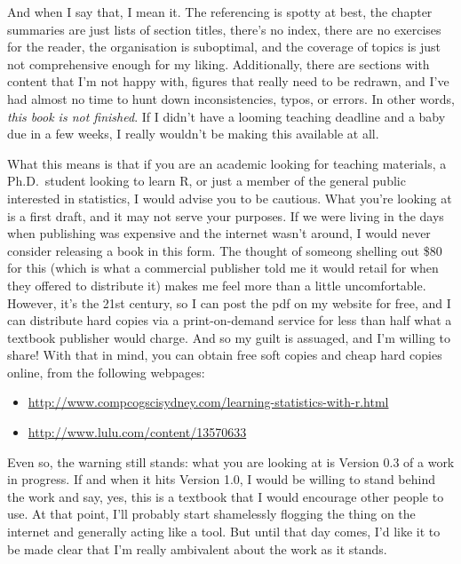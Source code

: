 \documentclass[
]{book}
\providecommand{\tightlist}{%
  \setlength{\itemsep}{0pt}\setlength{\parskip}{0pt}}
\begin{document}
And when I say that, I mean it. The referencing is spotty at best, the chapter summaries are just lists of section titles, there's no index, there are no exercises for the reader, the organisation is suboptimal, and the coverage of topics is just not comprehensive enough for my liking. Additionally, there are sections with content that I'm not happy with, figures that really need to be redrawn, and I've had almost no time to hunt down inconsistencies, typos, or errors. In other words, \emph{this book is not finished}. If I didn't have a looming teaching deadline and a baby due in a few weeks, I really wouldn't be making this available at all.

What this means is that if you are an academic looking for teaching materials, a Ph.D.~student looking to learn R, or just a member of the general public interested in statistics, I would advise you to be cautious. What you're looking at is a first draft, and it may not serve your purposes. If we were living in the days when publishing was expensive and the internet wasn't around, I would never consider releasing a book in this form. The thought of someong shelling out \$80 for this (which is what a commercial publisher told me it would retail for when they offered to distribute it) makes me feel more than a little uncomfortable. However, it's the 21st century, so I can post the pdf on my website for free, and I can distribute hard copies via a print-on-demand service for less than half what a textbook publisher would charge. And so my guilt is assuaged, and I'm willing to share! With that in mind, you can obtain free soft copies and cheap hard copies online, from the following webpages:

\begin{itemize}
\tightlist
\item
  \url{http://www.compcogscisydney.com/learning-statistics-with-r.html}
\item
  \url{http://www.lulu.com/content/13570633}
\end{itemize}

Even so, the warning still stands: what you are looking at is Version 0.3 of a work in progress. If and when it hits Version 1.0, I would be willing to stand behind the work and say, yes, this is a textbook that I would encourage other people to use. At that point, I'll probably start shamelessly flogging the thing on the internet and generally acting like a tool. But until that day comes, I'd like it to be made clear that I'm really ambivalent about the work as it stands.
\end{document}
